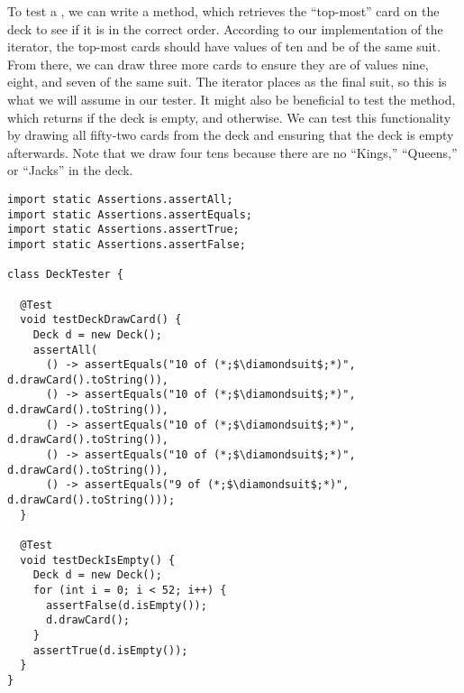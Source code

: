 To test a , we can write a  method, which retrieves the ``top-most'' card on the deck to see if it is in the correct order. According to our implementation of the iterator, the top-most cards should have values of ten and be of the same suit. From there, we can draw three more cards to ensure they are of values nine, eight, and seven of the same suit. The iterator places  as the final suit, so this is what we will assume in our tester. It might also be beneficial to test the  method, which returns  if the deck is empty, and  otherwise. We can test this functionality by drawing all fifty-two cards from the deck and ensuring that the deck is empty afterwards. Note that we draw four tens because there are no ``Kings,'' ``Queens,'' or ``Jacks'' in the deck.

\begin{lstlisting}[language=MyJava]
import static Assertions.assertAll;
import static Assertions.assertEquals;
import static Assertions.assertTrue;
import static Assertions.assertFalse;

class DeckTester {

  @Test
  void testDeckDrawCard() {
    Deck d = new Deck();
    assertAll(
      () -> assertEquals("10 of (*;$\diamondsuit$;*)", d.drawCard().toString()),
      () -> assertEquals("10 of (*;$\diamondsuit$;*)", d.drawCard().toString()),
      () -> assertEquals("10 of (*;$\diamondsuit$;*)", d.drawCard().toString()),
      () -> assertEquals("10 of (*;$\diamondsuit$;*)", d.drawCard().toString()),
      () -> assertEquals("9 of (*;$\diamondsuit$;*)", d.drawCard().toString()));
  }

  @Test
  void testDeckIsEmpty() {
    Deck d = new Deck();
    for (int i = 0; i < 52; i++) {
      assertFalse(d.isEmpty());
      d.drawCard();
    }
    assertTrue(d.isEmpty());
  }
}
\end{lstlisting}

